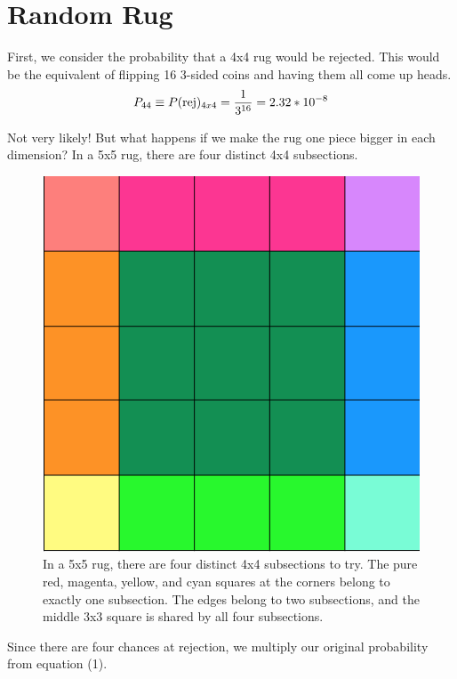 \documentclass[12pt]{article}
\begin{document}
\section*{Random Rug}

First, we consider the probability that a 4x4 rug would be rejected. This would be the equivalent of flipping 16 3-sided coins and having them all come up heads.
\begin{equation}
P_{44} \equiv P(\hbox{rej})_{4x4} = \frac{1}{3^{16}} = 2.32 * 10^{-8}
\end{equation}

Not very likely! But what happens if we make the rug one piece bigger in each dimension? In a 5x5 rug, there are four distinct 4x4 subsections.

\begin{figure}[h]
    \centering
    \includegraphics[scale=0.45]{5x5rugs.png}
    \caption{In a 5x5 rug, there are four distinct 4x4 subsections to try. The pure red, magenta, yellow, and cyan squares at the corners belong to exactly one subsection. The edges belong to two subsections, and the middle 3x3 square is shared by all four subsections.}
    \label{fig: four 4x4 subsections of rug}
\end{figure}

Since there are four chances at rejection, we multiply our original probability from equation (1). 
\end{document}
